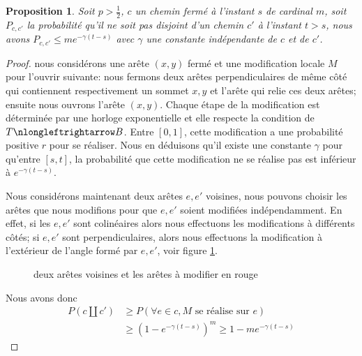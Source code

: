 \documentclass[titlepage,a4paper,12pt]{article}
\newcounter{prop}
\newtheorem{decexp}[prop]{Proposition}
\begin{document}
\begin{decexp}
Soit $p>\frac{1}{2}$, $c$ un chemin fermé à l'instant $s$ de cardinal $m$, soit $P_{c,c'}$ la probabilité qu'il ne soit pas disjoint d'un chemin $c'$ à l'instant $t>s$, nous avons $P_{c,c'}\leqslant me^{-\gamma(t-s)}$ avec $\gamma$ une constante indépendante de $c$ et de $c'$.
\end{decexp}
\begin{proof}
nous considérons une arête $(x,y)$ fermé et une modification locale $M$ pour l'ouvrir suivante: nous fermons deux arêtes perpendiculaires de même côté qui contiennent respectivement un sommet $x,y$ et l'arête qui relie ces deux arêtes; ensuite nous ouvrons l'arête $(x,y)$. Chaque étape de la modification est déterminée par une horloge exponentielle et elle respecte la condition de $T\nlongleftrightarrow B$. Entre $[0,1]$, cette modification a une probabilité positive $r$ pour se réaliser. Nous en déduisons qu'il existe une constante $\gamma$ pour qu'entre $[s,t]$, la probabilité que cette modification ne se réalise pas est inférieur à $e^{-\gamma(t-s)}$. 

Nous considérons maintenant deux arêtes $e,e'$ voisines, nous pouvons choisir les arêtes que nous modifions pour que $e,e'$ soient modifiées indépendamment. En effet, si les $e,e'$ sont colinéaires alors nous effectuons les modifications à différents côtés; si $e,e'$ sont perpendiculaires, alors nous effectuons la modification à l'extérieur de l'angle formé par $e,e'$, voir figure \ref{fig:mod}.

\begin{figure}[h]

\begin{minipage}{0.45\linewidth}
\center
{}
\end{minipage}
\hfill
\begin{minipage}{0.45\linewidth}
\center
{}
\end{minipage}
\caption{deux arêtes voisines et les arêtes à modifier en rouge}
\label{fig:mod}

\end{figure}

Nous avons donc 
\begin{align*}
 P(c \coprod c') &\geqslant P(\forall e \in c, M \text{ se réalise sur } e) \\
 & \geqslant (1-e^{-\gamma (t-s)})^m \geqslant 1-me^{-\gamma (t-s)}
\end{align*} 
\end{proof}
\end{document}
